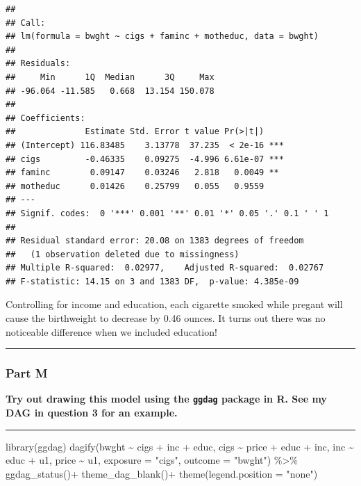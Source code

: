 \documentclass[
]{article}
\newenvironment{Shaded}{\begin{snugshade}}{\end{snugshade}}
\newcommand{\AttributeTok}[1]{\textcolor[rgb]{0.77,0.63,0.00}{#1}}
\newcommand{\FunctionTok}[1]{\textcolor[rgb]{0.00,0.00,0.00}{#1}}
\newcommand{\NormalTok}[1]{#1}
\newcommand{\SpecialCharTok}[1]{\textcolor[rgb]{0.00,0.00,0.00}{#1}}
\newcommand{\StringTok}[1]{\textcolor[rgb]{0.31,0.60,0.02}{#1}}
\begin{document}
\begin{verbatim}
## 
## Call:
## lm(formula = bwght ~ cigs + faminc + motheduc, data = bwght)
## 
## Residuals:
##     Min      1Q  Median      3Q     Max 
## -96.064 -11.585   0.668  13.154 150.078 
## 
## Coefficients:
##              Estimate Std. Error t value Pr(>|t|)    
## (Intercept) 116.83485    3.13778  37.235  < 2e-16 ***
## cigs         -0.46335    0.09275  -4.996 6.61e-07 ***
## faminc        0.09147    0.03246   2.818   0.0049 ** 
## motheduc      0.01426    0.25799   0.055   0.9559    
## ---
## Signif. codes:  0 '***' 0.001 '**' 0.01 '*' 0.05 '.' 0.1 ' ' 1
## 
## Residual standard error: 20.08 on 1383 degrees of freedom
##   (1 observation deleted due to missingness)
## Multiple R-squared:  0.02977,    Adjusted R-squared:  0.02767 
## F-statistic: 14.15 on 3 and 1383 DF,  p-value: 4.385e-09
\end{verbatim}

Controlling for income and education, each cigarette smoked while
pregant will cause the birthweight to decrease by 0.46 ounces. It turns
out there was no noticeable difference when we included education!

\begin{center}\rule{0.5\linewidth}{0.5pt}\end{center}

\hypertarget{part-m}{%
\subsubsection{Part M}\label{part-m}}

\textbf{Try out drawing this model using the \texttt{ggdag} package in
R. See my DAG in question 3 for an example.}

\begin{center}\rule{0.5\linewidth}{0.5pt}\end{center}

\begin{Shaded}
\begin{Highlighting}[]
\FunctionTok{library}\NormalTok{(ggdag)}
\FunctionTok{dagify}\NormalTok{(bwght }\SpecialCharTok{\textasciitilde{}}\NormalTok{ cigs }\SpecialCharTok{+}\NormalTok{ inc }\SpecialCharTok{+}\NormalTok{ educ,}
\NormalTok{       cigs }\SpecialCharTok{\textasciitilde{}}\NormalTok{ price }\SpecialCharTok{+}\NormalTok{ educ }\SpecialCharTok{+}\NormalTok{ inc,}
\NormalTok{       inc }\SpecialCharTok{\textasciitilde{}}\NormalTok{ educ }\SpecialCharTok{+}\NormalTok{ u1,}
\NormalTok{       price }\SpecialCharTok{\textasciitilde{}}\NormalTok{ u1,}
       \AttributeTok{exposure =} \StringTok{"cigs"}\NormalTok{,}
       \AttributeTok{outcome =} \StringTok{"bwght"}\NormalTok{) }\SpecialCharTok{\%\textgreater{}\%} 
  \FunctionTok{ggdag\_status}\NormalTok{()}\SpecialCharTok{+}
  \FunctionTok{theme\_dag\_blank}\NormalTok{()}\SpecialCharTok{+}
  \FunctionTok{theme}\NormalTok{(}\AttributeTok{legend.position =} \StringTok{"none"}\NormalTok{)}
\end{Highlighting}
\end{Shaded}
\end{document}

